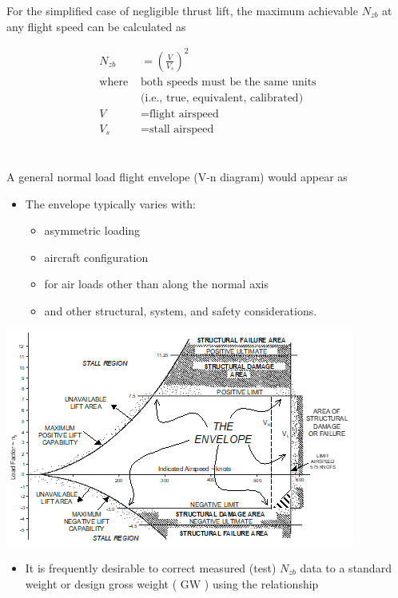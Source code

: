\documentclass[
]{book}
\providecommand{\tightlist}{%
  \setlength{\itemsep}{0pt}\setlength{\parskip}{0pt}}
\begin{document}
For the simplified case of negligible thrust lift, the maximum achievable \(N_{zb}\) at any flight speed can be calculated as

\[
  \begin{align}
  N_{zb} &= \left( \frac{V}{V_s} \right)^2 \\
  \text{where } &\text{both speeds must be the same units} \\
  &\text{(i.e., true, equivalent, calibrated)} \\
  V &= \text{flight airspeed} \\
  V_s &= \text{stall airspeed} \\
  \end{align}
\]~

A general normal load flight envelope (V-n diagram) would appear as

\begin{itemize}
\tightlist
\item
  The envelope typically varies with:

  \begin{itemize}
  \tightlist
  \item
    asymmetric loading
  \item
    aircraft configuration
  \item
    for air loads other than along the normal axis
  \item
    and other structural, system, and safety considerations.
  \end{itemize}
\end{itemize}

\includegraphics[width=4.52014in,height=2.81181in]{media/09/image3.png}

\begin{itemize}
\tightlist
\item
  It is frequently desirable to correct measured (test) \(N_{zb}\) data to a standard weight or design gross weight ( \(\mathrm{GW}\) ) using the relationship
\end{itemize}
\end{document}
